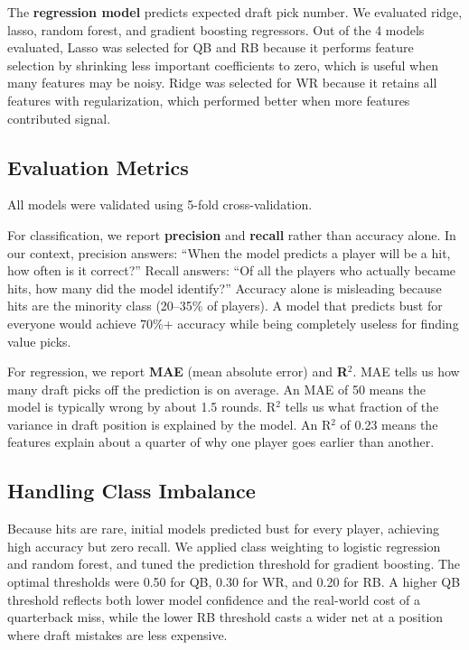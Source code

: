 \documentclass[10pt,twocolumn]{article}
\begin{document}
The \textbf{regression model} predicts expected draft pick number. We evaluated ridge, lasso, random forest, and gradient boosting regressors. Out of the 4 models evaluated, Lasso was selected for QB and RB because it performs feature selection by shrinking less important coefficients to zero, which is useful when many features may be noisy. Ridge was selected for WR because it retains all features with regularization, which performed better when more features contributed signal.

\subsection{Evaluation Metrics}

All models were validated using 5-fold cross-validation.

For classification, we report \textbf{precision} and \textbf{recall} rather than accuracy alone. In our context, precision answers: ``When the model predicts a player will be a hit, how often is it correct?'' Recall answers: ``Of all the players who actually became hits, how many did the model identify?'' Accuracy alone is misleading because hits are the minority class (20--35\% of players). A model that predicts bust for everyone would achieve 70\%+ accuracy while being completely useless for finding value picks.

For regression, we report \textbf{MAE} (mean absolute error) and \textbf{R$^2$}. MAE tells us how many draft picks off the prediction is on average. An MAE of 50 means the model is typically wrong by about 1.5 rounds. R$^2$ tells us what fraction of the variance in draft position is explained by the model. An R$^2$ of 0.23 means the features explain about a quarter of why one player goes earlier than another.

\subsection{Handling Class Imbalance}

Because hits are rare, initial models predicted bust for every player, achieving high accuracy but zero recall. We applied class weighting to logistic regression and random forest, and tuned the prediction threshold for gradient boosting. The optimal thresholds were 0.50 for QB, 0.30 for WR, and 0.20 for RB. A higher QB threshold reflects both lower model confidence and the real-world cost of a quarterback miss, while the lower RB threshold casts a wider net at a position where draft mistakes are less expensive.
\end{document}
